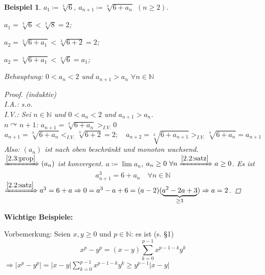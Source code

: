 \documentclass[titlepage,ngerman,a4paper,headsepline]{scrartcl}
\newcommand{\N}{\mathbb{N}}
\theoremstyle{named}
\theoremstyle{dotless}
\newtheorem*{beispiel*}{Beispiel}
\begin{document}
\begin{beispiel*} $a_{1} \coloneqq \sqrt[3]{6}$, $a_{n + 1} \coloneqq \sqrt[3]{6 + a_{n}}$ $(n \geq 2)$.
	\begin{description}
		\item $a_{1} = \sqrt[3]{6} < \sqrt[3]{8} = 2$;
		\item $a_{2} = \sqrt[3]{6 + a_{1}} < \sqrt[3]{6 + 2} = 2$;
		\item $a_{2} = \sqrt[3]{6 + a_{1}} < \sqrt[3]{6} = a_{1}$;
	\end{description}
	Behauptung: $0 < a_{n} < 2$ und $a_{n + 1} > a_{n}$ $\forall n \in \N$

	\begin{proof}(induktiv) \\
		I.A.: s.o. \\
		I.V.: Sei $n \in \N$ und $0 < a_{n} < 2$ und $a_{n+1} > a_{n}$. \\
		$n \curvearrowright n + 1$: $a_{n + 1} = \sqrt[3]{6 + a_{n}} >_{I.V.} 0$
		$$
			a_{n +1} = \sqrt[3]{6 + a_{n}} <_{I.V.} \sqrt[3]{6 + 2} = 2; \quad a_{n + 2} = \sqrt[3]{6 + a_{n+1}} >_{I.V.} \sqrt[3]{6 + a_{n}} = a_{n + 1}
		$$
		Also: $(a_{n})$ ist nach oben beschränkt und monoton wachsend. \\
		$\xRightarrow[]{\ref{2.3:prop}} (a_{n})$ ist konvergent. $a \coloneqq \lim a_{n}$, $a_{n} \geq 0 ~\forall n \xRightarrow[]{\ref{2.2:satz}} a \geq 0$. Es ist
		$$
			a_{n+1}^{3} = 6 + a_{n} \quad \forall n \in \N
		$$
		$\xRightarrow[]{\ref{2.2:satz}} a^{3} = 6 + a \Rightarrow 0 = a^{3} - a + 6 = (a-2)(\underbrace{a^{2}-2a+3}_{\geq 3}) \Rightarrow a = 2$.
	\end{proof}
\end{beispiel*}


\textbf{Wichtige Beispiele:} 


Vorbemerkung: Seien $x, y \geq 0$ und $p \in \N$: es ist (s. \S 1)
	$$ x^{p} - y^{p} = (x - y) \sum_{k = 0}^{p-1} x^{p-1-k}y^{k} $$
$\Rightarrow |x^{p} - y^{p}| = |x-y| \sum_{k=0}^{p-1} x^{p-1-k}y^{k} \geq y^{p-1} |x - y|$
\end{document}
